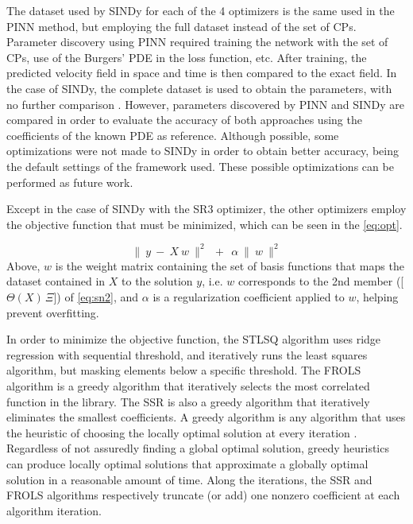 The dataset used by SINDy for each of the 4 optimizers is the same used in the PINN method, but employing the full dataset instead of the set of CPs. Parameter discovery using PINN required training the network with the set of CPs, use of the Burgers' PDE in the loss function, etc. After training, the predicted velocity field in space and time is then compared to the exact field. In the case of SINDy, the complete dataset is used to obtain the parameters, with no further comparison \cite{Brunton2016}. However, parameters discovered by PINN and SINDy are compared in order to evaluate the accuracy of both approaches using the coefficients of the known PDE as reference. Although possible, some optimizations were not made to SINDy in order to obtain better accuracy, being the default settings of the framework used. These possible optimizations can be performed as future work.

Except in the case of SINDy with the SR3 optimizer, the other optimizers employ the objective function that must be minimized, which can be seen in the \autoref{eq:opt}.

\begin{minipage}[htb]{.95\columnwidth}\bigskip\begin{equation}
\| \ y \ - \ X \ w \ \|^2 \ \ + \ \ \alpha \ \| \ w \ \|^2
\label{eq:opt}\end{equation}
Above, $w$ is the weight matrix containing the set of basis functions that maps the dataset contained in $X$ to the solution $y$, i.e. $w$ corresponds to the 2nd member ([$\Theta(X)\,\Xi$]) of \autoref{eq:sn2}, and $\alpha$ is a regularization coefficient applied to $w$, helping prevent overfitting.
\bigskip\end{minipage}%

In order to minimize the objective function, the STLSQ \cite{Brunton2016} algorithm uses ridge regression with sequential threshold, and iteratively runs the least squares algorithm, but masking elements below a specific threshold. The FROLS \cite{Billings2013} algorithm is a greedy algorithm that iteratively selects the most correlated function in the library. The SSR \cite{Boninsegna2018} is also a greedy algorithm that iteratively eliminates the smallest coefficients. A greedy algorithm is any algorithm that uses the heuristic of choosing the locally optimal solution at every iteration \cite{Black2005}. Regardless of not assuredly finding a global optimal solution, greedy heuristics can produce locally optimal solutions that approximate a globally optimal solution in a reasonable amount of time. Along the iterations, the SSR and FROLS algorithms respectively truncate (or add) one nonzero coefficient at each algorithm iteration.

